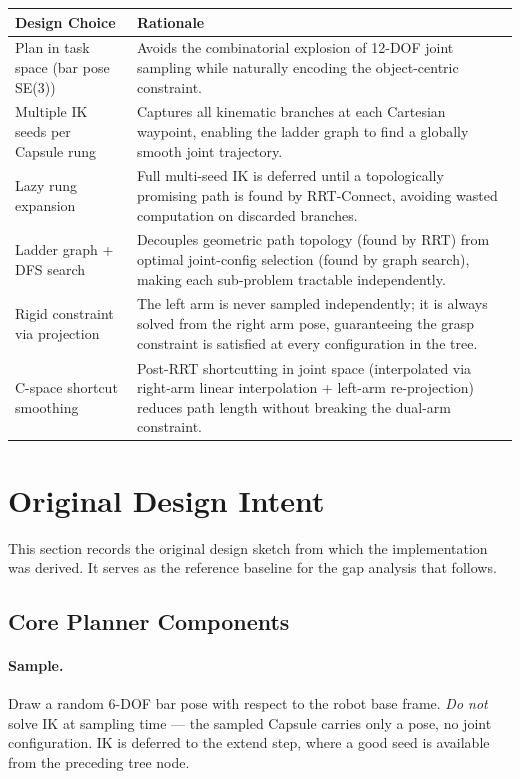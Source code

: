 \documentclass[11pt]{article}
\begin{document}
\begin{center}
\begin{tabular}{lp{9cm}}
\toprule
\textbf{Design Choice} & \textbf{Rationale} \\
\midrule
Plan in task space (bar pose SE(3)) &
  Avoids the combinatorial explosion of 12-DOF joint sampling while
  naturally encoding the object-centric constraint. \\[4pt]
Multiple IK seeds per Capsule rung &
  Captures all kinematic branches at each Cartesian waypoint, enabling the
  ladder graph to find a globally smooth joint trajectory. \\[4pt]
Lazy rung expansion &
  Full multi-seed IK is deferred until a topologically promising path is
  found by RRT-Connect, avoiding wasted computation on discarded branches. \\[4pt]
Ladder graph + DFS search &
  Decouples geometric path topology (found by RRT) from optimal
  joint-config selection (found by graph search), making each sub-problem
  tractable independently. \\[4pt]
Rigid constraint via projection &
  The left arm is never sampled independently; it is always solved from the
  right arm pose, guaranteeing the grasp constraint is satisfied at every
  configuration in the tree. \\[4pt]
C-space shortcut smoothing &
  Post-RRT shortcutting in joint space (interpolated via right-arm linear
  interpolation + left-arm re-projection) reduces path length without
  breaking the dual-arm constraint. \\
\bottomrule
\end{tabular}
\end{center}

\newpage
\section*{Original Design Intent}

This section records the original design sketch from which the implementation was
derived.  It serves as the reference baseline for the gap analysis that follows.

\subsection*{Core Planner Components}

\paragraph{Sample.}
Draw a random 6-DOF bar pose with respect to the robot base frame.
\emph{Do not} solve IK at sampling time — the sampled Capsule carries only a pose,
no joint configuration.  IK is deferred to the extend step, where a good seed is
available from the preceding tree node.
\end{document}
